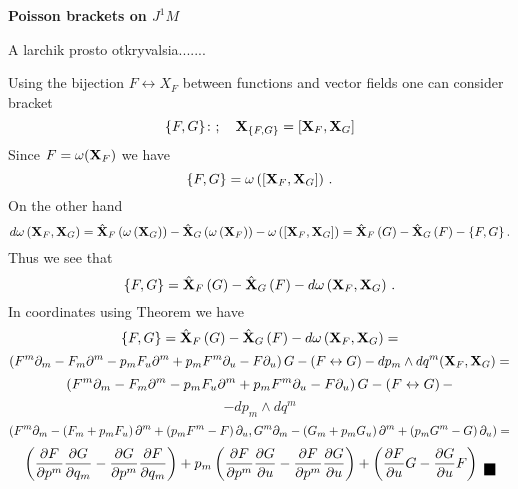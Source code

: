 \medskip
\centerline {\bf Poisson brackets on $J^1M$}

\qquad\qquad\qquad                A larchik prosto otkryvalsia.......



Using the bijection $F\leftrightarrow X_F$  between functions
and vector fields one can consider bracket
      $$
\{F,G\}\colon;\quad  {\bf X}_{\{F,G\}}=\left[{\bf X}_F,{\bf X}_G\right]
      $$
   Since  $F={\omega}({\bf X}_F)$ we have
          $$
\{F,G\}={\omega}\left(\left[{\bf X}_F,{\bf X}_G\right]\right)\,.
          $$
On the other hand
           $$
d{\omega}\left({\bf X}_F,{\bf X}_G\right)=
\hat {{\bf X}}_F
\left({\omega}\left({\bf X}_G\right)\right)-
\hat {{\bf X}}_G
\left({\omega}\left({\bf X}_F\right)\right)-
{\omega}\left(\left[{\bf X}_F,{\bf X}_G\right]\right)=
\hat {{\bf X}}_F
\left(G\right)-
\hat {{\bf X}}_G
\left(F\right)-
\{F,G\}\,.
           $$
Thus  we see that
        $$
\{F,G\}=
\hat {{\bf X}}_F
\left(G\right)-
\hat {{\bf X}}_G
\left(F\right)-
d{\omega}\left({\bf X}_F,{\bf X}_G\right)\,.
        $$
    In coordinates  using Theorem we have
             $$
\{F,G\}=
\hat {{\bf X}}_F
\left(G\right)-
\hat {{\bf X}}_G
\left(F\right)-
d{\omega}\left({\bf X}_F,{\bf X}_G\right)=
             $$ 
      $$
\left(F^m\partial_m-F_m\partial^m-p_mF_u\partial^m+p_mF^m\partial_u-F\partial_u\right)G-
 \left(F\leftrightarrow G\right)-dp_m\wedge dq^m({\bf X}_F,{\bf X}_G)=
        $$
         $$
\left(F^m\partial_m-F_m\partial^m-p_mF_u\partial^m+p_mF^m\partial_u-F\partial_u\right)G-
 \left(F\leftrightarrow G\right)-
           $$
        $$
-dp_m\wedge dq^m
       $$
       $$
   \left(
F^m\partial_m-\left(F_m+p_mF_u\right)\partial^m
+\left(p_mF^m-F\right)\partial_u 
,
 G^m\partial_m-\left(G_m+p_mG_u\right)\partial^m
+\left(p_mG^m-G\right)\partial_u 
\right)=
      $$
      $$
      \left(
{\p F\over \p p^m}
{\p G\over \p q_m}
     -
{\p G\over \p p^m}
{\p F\over \p q_m}
    \right)
        +
          p_m
      \left(
{\p F\over \p p^m}
{\p G\over \p u}
     -
{\p F\over \p p^m}
{\p G\over \p u}
    \right)
        +
      \left(
{\p F\over \p u}
       G
     -
{\p G\over \p u}
        F
    \right)
       \hbox{\finish}
      $$

\bye

